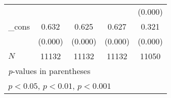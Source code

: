 {\begin{tabular}{l*{4}{c}}
            &                     &                     &                     &     (0.000)         \\
[1em]
\_cons      &       0.632\sym{***}&       0.625\sym{***}&       0.627\sym{***}&       0.321\sym{***}\\
            &     (0.000)         &     (0.000)         &     (0.000)         &     (0.000)         \\
\hline
\(N\)       &       11132         &       11132         &       11132         &       11050         \\
\hline\hline
\multicolumn{5}{l}{\footnotesize \textit{p}-values in parentheses}\\
\multicolumn{5}{l}{\footnotesize \sym{*} \(p<0.05\), \sym{**} \(p<0.01\), \sym{***} \(p<0.001\)}\\
\end{tabular}
}
